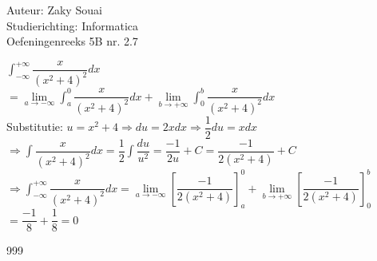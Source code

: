 \documentclass[a4paper]{article}
\begin{document}
  
\noindent \large Auteur: Zaky Souai \\
\noindent \large Studierichting:  Informatica\\
\noindent \large Oefeningenreeks 5B nr. 2.7\\

\bigskip

\normalsize

$\displaystyle \int_{-\infty}^{+\infty} \dfrac{x}{(x^2 + 4)^2} dx$\\

$= \lim\limits_{a \to -\infty} \int_a^0 \dfrac{x}{(x^2 + 4)^2} dx +\lim\limits_{b \to +\infty} \int_0^b \dfrac{x}{(x^2 + 4)^2} dx$ \\

Substitutie:
$u = x^2 + 4 \Rightarrow du = 2x dx \Rightarrow \dfrac{1}{2} du = x dx$ \\

$\Rightarrow \displaystyle \int \dfrac{x}{(x^2 + 4)^2} dx = \dfrac{1}{2} \int \dfrac{du}{u^2} = \dfrac{-1}{2u} + C = \dfrac{-1}{2(x^2 + 4)} + C$ \\


$ \Rightarrow \displaystyle \int_{-\infty}^{+\infty} \dfrac{x}{(x^2 + 4)^2} dx = \lim\limits_{a \to -\infty} \left[ \dfrac{-1}{2(x^2 + 4)} \right]_a^0 + \lim\limits_{b \to +\infty} \left[ \dfrac{-1}{2(x^2 + 4)} \right]_0^b$ \\

$= \dfrac{-1}{8} + \dfrac{1}{8} = 0$ \\

\begin{thebibliography}{999}
\end{thebibliography}
\end{document}

